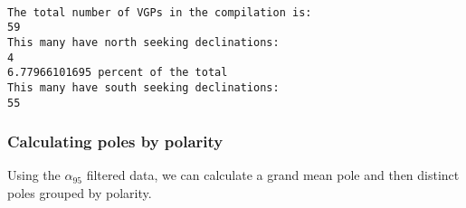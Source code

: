 \documentclass{article}
\begin{document}
    \begin{center}
    \end{center}
    { \hspace*{\fill} \\}
    
    \begin{Verbatim}[commandchars=\\\{\}]
The total number of VGPs in the compilation is:
59
This many have north seeking declinations:
4
6.77966101695 percent of the total
This many have south seeking declinations:
55
    \end{Verbatim}

    \subsubsection{Calculating poles by
polarity}\label{calculating-poles-by-polarity}

Using the \(\alpha_{95}\) filtered data, we can calculate a grand mean
pole and then distinct poles grouped by polarity.
\end{document}
